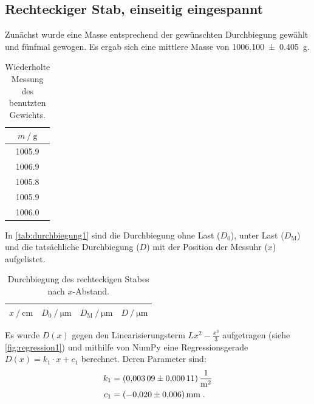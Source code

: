 \subsection{Rechteckiger Stab, einseitig eingespannt} \label{sec:auswertung_einseitig_rechteckig}
Zunächst wurde eine Masse entsprechend der gewünschten Durchbiegung gewählt und fünfmal gewogen.
Es ergab sich eine mittlere Masse von \SI{1006.100 \pm 0.405}{\gram}.

\begin{table}
\centering
\caption{Wiederholte Messung des benutzten Gewichts.}
\begin{tabular}{c}
\toprule
$m \mathbin{/} \si{\gram}$ \\
\midrule
\num{1005.9} \\
\num{1006.9} \\
\num{1005.8} \\
\num{1005.9} \\
\num{1006.0} \\
\bottomrule
\end{tabular}
\end{table}


In \autoref{tab:durchbiegung1} sind die Durchbiegung ohne Last ($D_\text{0}$), unter Last ($D_\text{M}$) und die tatsächliche Durchbiegung ($D$) mit der Position der Messuhr ($x$) aufgelistet.

\begin{table}
\centering
\caption{Durchbiegung des rechteckigen Stabes nach $x$-Abstand.}
\label{tab:durchbiegung1}
\begin{tabular}{c c c c}
\toprule
$x \mathbin{/} \si{\centi\meter}$ &
$D_0 \mathbin{/} \si{\micro\meter}$ &
$D_\text{M} \mathbin{/} \si{\micro\meter}$ &
$D \mathbin{/} \si{\micro\meter}$ \\
\midrule

\bottomrule
\end{tabular}
\end{table}

\FloatBarrier

Es wurde $D(x)$ gegen den Linearisierungsterm $Lx^2-\frac{x^3}{3}$ aufgetragen (siehe \autoref{fig:regression1})
und mithilfe von NumPy eine Regressionsgerade $D(x) = k_1 \cdot x + c_1$ berechnet.
Deren Parameter sind:
\begin{align*}
  k_1 &= \SI{0.00309 \pm 0.00011}{\meter\tothe{-2}} \\
  c_1 &= \SI{-0.020 \pm 0.006}{\milli\meter} \; .
\end{align*}

